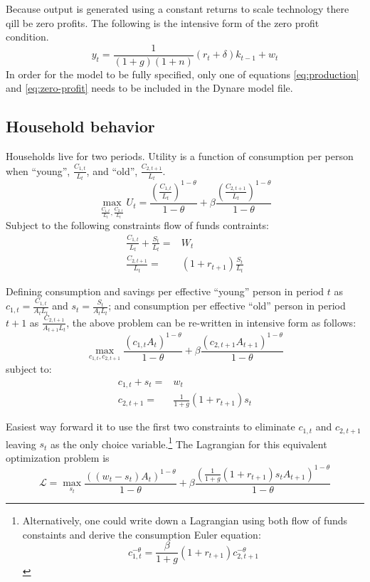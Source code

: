 \documentclass[11pt]{article}
\begin{document}
Because output is generated using a constant returns to scale technology there qill be zero profits.  The following is the intensive form of the zero profit condition.
\begin{equation}\label{eq:zero-profit}
y_t = \frac{1}{(1 + g)(1 + n)}(r_t + \delta)k_{t-1} + w_t 
\end{equation}
In order for the model to be fully specified, only one of equations \ref{eq:production} and \ref{eq:zero-profit} needs to be included in the Dynare model file. 

\subsection{Household behavior}
Households live for two periods. Utility is a function of consumption per person when ``young'', $\frac{C_{1,t}}{L_t}$,  and ``old'', $\frac{C_{2,t+1}}{L_t}$.
\begin{equation}
\max_{\frac{C_{1,t}}{L_t}, \frac{C_{2,t}}{L_t}} U_t = \frac{\left(\frac{C_{1,t}}{L_t}\right)^{1 - \theta}}{1-\theta} + \beta \frac{\left(\frac{C_{2,t+1}}{L_t}\right)^{1 - \theta}}{1-\theta}
\end{equation}
Subject to the following constraints flow of funds contraints:
\begin{align}
\frac{C_{1,t}}{L_t} + \frac{S_t}{L_t} =& W_t \\
\frac{C_{2,t+1}}{L_t} =& (1 + r_{t+1})\frac{S_{t}}{L_t}
\end{align} 

Defining consumption and savings per effective ``young'' person in period $t$ as $c_{1,t}=\frac{C_{1,t}}{A_tL_t}$ and $s_t = \frac{S_t}{A_tL_t}$; and consumption per effective ``old'' person in period $t+1$ as $\frac{C_{2,t+1}}{A_{t+1}L_t}$, the above problem can be re-written in intensive form as follows:
\begin{equation}
\max_{c_{1,t}, c_{2,t+1}} \frac{(c_{1,t}A_t)^{1 - \theta}}{1 - \theta} + \beta \frac{(c_{2,t+1}A_{t+1})^{1 - \theta}}{1 - \theta}
\end{equation} 
subject to:
\begin{align}
c_{1,t} + s_t =& w_t \\
c_{2,t+1} =& \frac{1}{1+g}(1 + r_{t+1})s_{t}
\end{align}

Easiest way forward it to use the first two constraints to eliminate $c_{1,t}$ and $c_{2,t+1}$ leaving $s_t$ as the only choice variable.\footnote{Alternatively, one could write down a Lagrangian using both flow of funds constaints and derive the consumption Euler equation:
\begin{equation}
c_{1,t}^{-\theta} = \frac{\beta}{1 + g}(1 + r_{t+1})c_{2,t+1}^{-\theta}
\end{equation}
} The Lagrangian for this equivalent optimization problem is
\begin{equation}
\mathcal{L} = \max_{s_t} \frac{((w_t - s_t)A_t)^{1 - \theta}}{1 - \theta} + \beta \frac{\left(\frac{1}{1+g}(1 + r_{t+1})s_{t}A_{t+1}\right)^{1 - \theta}}{1 - \theta}
\end{equation}
\end{document}
